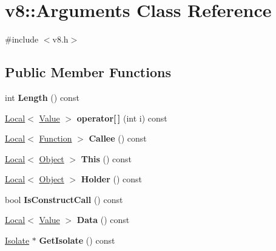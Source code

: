 \hypertarget{classv8_1_1_arguments}{}\section{v8\+:\+:Arguments Class Reference}
\label{classv8_1_1_arguments}


{\ttfamily \#include $<$v8.\+h$>$}

\subsection*{Public Member Functions}
\begin{DoxyCompactItemize}
\item 
\hypertarget{classv8_1_1_arguments_a97eccdad977805addef87a226e8fa3ea}{}int {\bfseries Length} () const \label{classv8_1_1_arguments_a97eccdad977805addef87a226e8fa3ea}

\item 
\hypertarget{classv8_1_1_arguments_a5e1469798ec583dea629f0133642ba57}{}\hyperlink{classv8_1_1_local}{Local}$<$ \hyperlink{classv8_1_1_value}{Value} $>$ {\bfseries operator\mbox{[}$\,$\mbox{]}} (int i) const \label{classv8_1_1_arguments_a5e1469798ec583dea629f0133642ba57}

\item 
\hypertarget{classv8_1_1_arguments_a80af1dbab38d48ae31942bb18bfe09a7}{}\hyperlink{classv8_1_1_local}{Local}$<$ \hyperlink{classv8_1_1_function}{Function} $>$ {\bfseries Callee} () const \label{classv8_1_1_arguments_a80af1dbab38d48ae31942bb18bfe09a7}

\item 
\hypertarget{classv8_1_1_arguments_a379e33897093c39b30ba93915d5d0427}{}\hyperlink{classv8_1_1_local}{Local}$<$ \hyperlink{classv8_1_1_object}{Object} $>$ {\bfseries This} () const \label{classv8_1_1_arguments_a379e33897093c39b30ba93915d5d0427}

\item 
\hypertarget{classv8_1_1_arguments_abd1ec0262e216fccd1562d73883b79a7}{}\hyperlink{classv8_1_1_local}{Local}$<$ \hyperlink{classv8_1_1_object}{Object} $>$ {\bfseries Holder} () const \label{classv8_1_1_arguments_abd1ec0262e216fccd1562d73883b79a7}

\item 
\hypertarget{classv8_1_1_arguments_aeffe00062bc761f815b6ffb9897cec0e}{}bool {\bfseries Is\+Construct\+Call} () const \label{classv8_1_1_arguments_aeffe00062bc761f815b6ffb9897cec0e}

\item 
\hypertarget{classv8_1_1_arguments_ac6d32758f78341929783ab2112dd5f7f}{}\hyperlink{classv8_1_1_local}{Local}$<$ \hyperlink{classv8_1_1_value}{Value} $>$ {\bfseries Data} () const \label{classv8_1_1_arguments_ac6d32758f78341929783ab2112dd5f7f}

\item 
\hypertarget{classv8_1_1_arguments_ad221621efa8cba90f314e65e6e783604}{}\hyperlink{classv8_1_1_isolate}{Isolate} $\ast$ {\bfseries Get\+Isolate} () const \label{classv8_1_1_arguments_ad221621efa8cba90f314e65e6e783604}

\end{DoxyCompactItemize}
